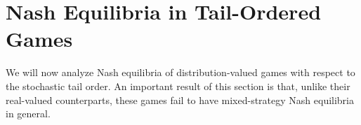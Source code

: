 \documentclass[a4paper]{scrreprt}
\theoremstyle{definition}
\begin{document}
%    
     
    
    \section{Nash Equilibria in Tail-Ordered Games}
    We will now analyze Nash equilibria of distribution-valued games with respect to the stochastic tail order.
    An important result of this section is that, unlike their real-valued counterparts, these games fail to have mixed-strategy Nash equilibria in general.
    
\end{document}
